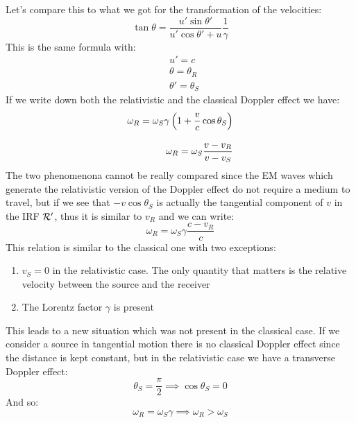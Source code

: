 Let's compare this to what we got for the transformation of the velocities:
\begin{equation}
  \tan \theta = \dfrac{u'\sin \theta'}{u'\cos \theta' + u}\dfrac{1}{\gamma}
\end{equation}
This is the same formula with:
\begin{equation}
  \begin{split}
    &u' = c \\[8pt]
    &\theta = \theta_R \\[8pt]
    &\theta' = \theta_S
  \end{split}
\end{equation}
If we write down both the relativistic and the classical Doppler effect we have:
\begin{equation}
  \begin{split}
    \omega_R  = \omega_S \gamma\left(1 + \dfrac{v}{c}\cos \theta_S\right) \\[8pt]
    \omega_R = \omega_S \dfrac{v - v_R}{v - v_S}
  \end{split}
\end{equation}
The two phenomenona cannot be really compared since the EM waves which generate the relativistic version of the Doppler effect do not require a medium to travel, but if we see that $-v \cos \theta_S$ is actually the tangential component of $v$ in the IRF $\mathcal{R}'$, thus it is similar to $v_R$ and we can write:
\begin{equation}
  \omega_R  = \omega_S \gamma\dfrac{c - v_R}{c}
\end{equation}
This relation is similar to the classical one with two exceptions:
\begin{enumerate}
  \item $v_S = 0$ in the relativistic case. The only quantity that matters is the relative velocity between the source and the receiver
  \item The Lorentz factor $\gamma$ is present
\end{enumerate}
This leads to a new situation which was not present in the classical case. If we consider a source in tangential motion there is no classical Doppler effect since the distance is kept constant, but in the relativistic case we have a transverse Doppler effect:
\begin{equation}
  \theta_S = \dfrac{\pi}{2} \implies \cos \theta_S = 0
\end{equation}
And so:
\begin{equation}
  \omega_R  = \omega_S \gamma \implies \omega_R  > \omega_S
\end{equation}
